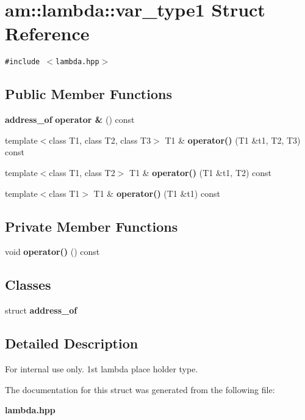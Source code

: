 \section{am::lambda::var\_\-type1 Struct Reference}
\label{structam_1_1lambda_1_1var__type1}
{\tt \#include $<$lambda.hpp$>$}

\subsection*{Public Member Functions}
\begin{CompactItemize}
\item 
{\bf address\_\-of} \textbf{operator \&} () const\label{structam_1_1lambda_1_1var__type1_f8eaa82c77daba44d3aed685a3304b10}

\item 
template$<$class T1, class T2, class T3$>$ T1 \& \textbf{operator()} (T1 \&t1, T2, T3) const \label{structam_1_1lambda_1_1var__type1_0bd48ce6c2c88fa3b0025f50f8d7ea60}

\item 
template$<$class T1, class T2$>$ T1 \& \textbf{operator()} (T1 \&t1, T2) const\label{structam_1_1lambda_1_1var__type1_740a4d3e513892cf02fb251aabd98923}

\item 
template$<$class T1$>$ T1 \& \textbf{operator()} (T1 \&t1) const\label{structam_1_1lambda_1_1var__type1_e408c4a011310bb264ce39aa2832501b}

\end{CompactItemize}
\subsection*{Private Member Functions}
\begin{CompactItemize}
\item 
void \textbf{operator()} () const\label{structam_1_1lambda_1_1var__type1_91b07bba79271aade1600d8970932b39}

\end{CompactItemize}
\subsection*{Classes}
\begin{CompactItemize}
\item 
struct {\bf address\_\-of}
\end{CompactItemize}


\subsection{Detailed Description}
\begin{Desc}
\item[For internal use only.]
1st lambda place holder type. \end{Desc}




The documentation for this struct was generated from the following file:\begin{CompactItemize}
\item 
{\bf lambda.hpp}\end{CompactItemize}
